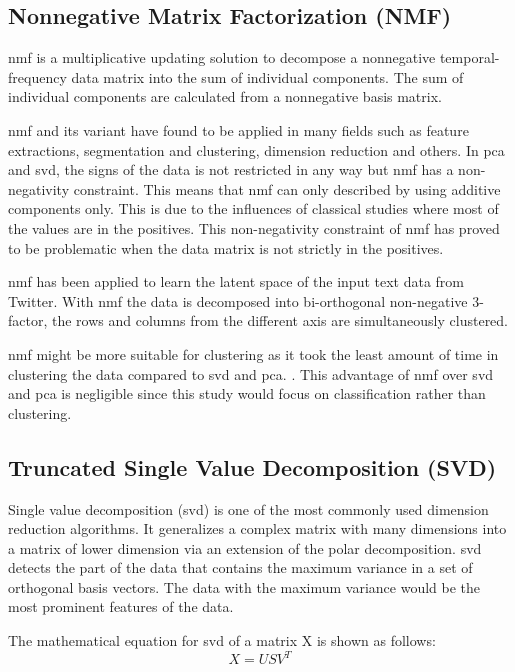 \subsection{Nonnegative Matrix Factorization (NMF)}
\Ac{nmf} is a multiplicative updating solution to decompose a nonnegative temporal-frequency data matrix into the sum of individual components. The sum of individual components are calculated from a nonnegative basis matrix. \cite{nmfBook}

\Ac{nmf} and its variant have found to be applied in many fields such as feature extractions, segmentation and clustering, dimension reduction and others. In \ac{pca} and \ac{svd}, the signs of the data is not restricted in any way but \ac{nmf} has a non-negativity constraint. This means that \ac{nmf} can only described by using additive components only. This is due to the influences of classical studies where most of the values are in the positives. This non-negativity constraint of \ac{nmf} has proved to be problematic when the data matrix is not strictly in the positives. \cite{semiNmfPca}

\Ac{nmf} has been applied to learn the latent space of the input text data from Twitter. With \ac{nmf} the data is decomposed into bi-orthogonal non-negative 3-factor, the rows and columns from the different axis are simultaneously clustered. \cite{nmfTwitter}

\Ac{nmf} might be more suitable for clustering as it took the least amount of time in clustering the data compared to \ac{svd} and \ac{pca}. \cite{nmfClustering}. This advantage of \ac{nmf} over \ac{svd} and \ac{pca} is negligible since this study would focus on classification rather than clustering.\\


\subsection{Truncated Single Value Decomposition (SVD)}
Single value decomposition (\ac{svd}) is one of the most commonly used dimension reduction algorithms. It generalizes a complex matrix with many dimensions into a matrix of lower dimension via an extension of the polar decomposition. \Ac{svd} detects the part of the data that contains the maximum variance in a set of orthogonal basis vectors. The data with the maximum variance would be the most prominent features of the data. \cite{svdDef}

The mathematical equation for \ac{svd} of a matrix X is shown as follows:
\begin{equation}
X = USV^{T}
\end{equation}

